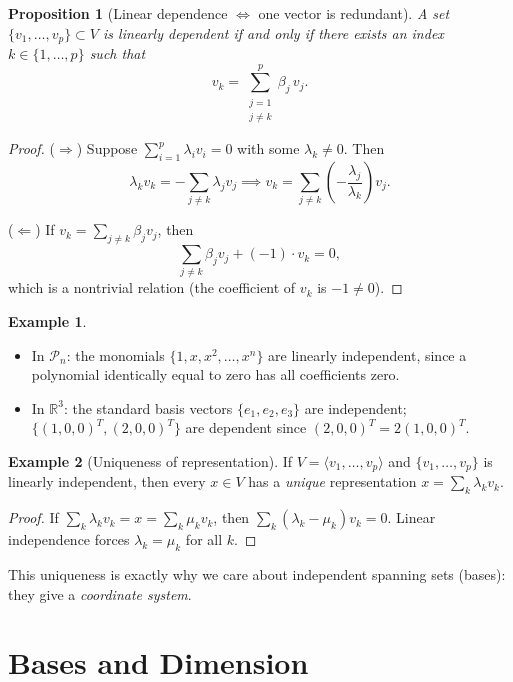 \documentclass[11pt]{article}
\theoremstyle{definition}
\newtheorem{example}{Example}[section]
\theoremstyle{plain}
\newtheorem{proposition}{Proposition}[section]
\begin{document}
\begin{proposition}[Linear dependence $\iff$ one vector is redundant]
  A set $\{v_1,\ldots,v_p\}\subset V$ is linearly dependent if and only if
  there exists an index $k\in\{1,\ldots,p\}$ such that
  \[
    v_k = \sum_{\substack{j=1\\j\ne k}}^p \beta_j\, v_j.
  \]
\end{proposition}
\begin{proof}
  ($\Rightarrow$) Suppose $\sum_{i=1}^p \lambda_i v_i = 0$ with some
  $\lambda_k\ne 0$.  Then
  \[
    \lambda_k v_k = -\sum_{j\ne k}\lambda_j v_j
    \implies
    v_k = \sum_{j\ne k}\left(-\frac{\lambda_j}{\lambda_k}\right)v_j.
  \]

  ($\Leftarrow$) If $v_k = \sum_{j\ne k}\beta_j v_j$, then
  \[
    \sum_{j\ne k}\beta_j v_j + (-1)\cdot v_k = 0,
  \]
  which is a nontrivial relation (the coefficient of $v_k$ is $-1\ne 0$).
\end{proof}

\begin{example}
  \leavevmode
  \begin{itemize}
    \item In $\mathcal{P}_n$: the monomials $\{1, x, x^2, \ldots, x^n\}$
      are linearly independent, since a polynomial identically equal to zero
      has all coefficients zero.
    \item In $\mathbb{R}^3$: the standard basis vectors
      $\{e_1,e_2,e_3\}$ are independent; $\{(1,0,0)^T,(2,0,0)^T\}$ are
      dependent since $(2,0,0)^T = 2(1,0,0)^T$.
  \end{itemize}
\end{example}

\begin{example}[Uniqueness of representation]
  If $V = \langle v_1,\ldots,v_p\rangle$ and $\{v_1,\ldots,v_p\}$ is
  linearly independent, then every $x\in V$ has a \emph{unique}
  representation $x = \sum_k \lambda_k v_k$.
  \begin{proof}
    If $\sum_k \lambda_k v_k = x = \sum_k \mu_k v_k$, then
    $\sum_k(\lambda_k-\mu_k)v_k = 0$.  Linear independence forces
    $\lambda_k = \mu_k$ for all $k$.
  \end{proof}
  This uniqueness is exactly why we care about independent spanning sets
  (bases): they give a \emph{coordinate system}.
\end{example}

\section{Bases and Dimension}
\end{document}
